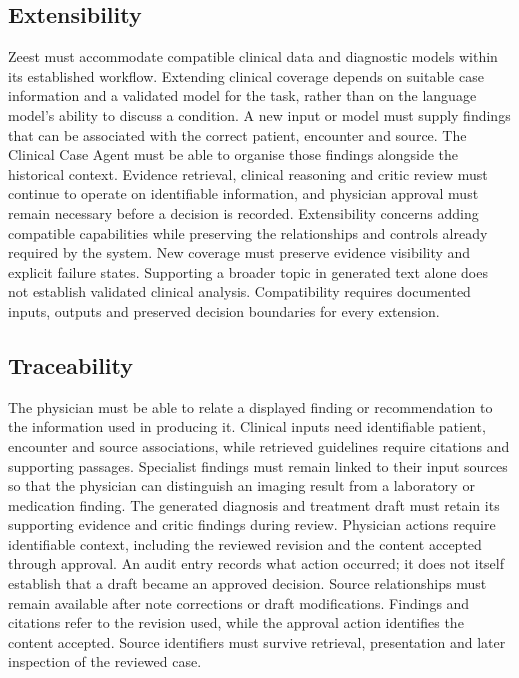 \subsection{Extensibility}

Zeest must accommodate compatible clinical data and diagnostic models within its established workflow. Extending clinical coverage depends on suitable case information and a validated model for the task, rather than on the language model's ability to discuss a condition. A new input or model must supply findings that can be associated with the correct patient, encounter and source. The Clinical Case Agent must be able to organise those findings alongside the historical context. Evidence retrieval, clinical reasoning and critic review must continue to operate on identifiable information, and physician approval must remain necessary before a decision is recorded. Extensibility concerns adding compatible capabilities while preserving the relationships and controls already required by the system. New coverage must preserve evidence visibility and explicit failure states. Supporting a broader topic in generated text alone does not establish validated clinical analysis. Compatibility requires documented inputs, outputs and preserved decision boundaries for every extension.

\subsection{Traceability}

The physician must be able to relate a displayed finding or recommendation to the information used in producing it. Clinical inputs need identifiable patient, encounter and source associations, while retrieved guidelines require citations and supporting passages. Specialist findings must remain linked to their input sources so that the physician can distinguish an imaging result from a laboratory or medication finding. The generated diagnosis and treatment draft must retain its supporting evidence and critic findings during review. Physician actions require identifiable context, including the reviewed revision and the content accepted through approval. An audit entry records what action occurred; it does not itself establish that a draft became an approved decision. Source relationships must remain available after note corrections or draft modifications. Findings and citations refer to the revision used, while the approval action identifies the content accepted. Source identifiers must survive retrieval, presentation and later inspection of the reviewed case.

